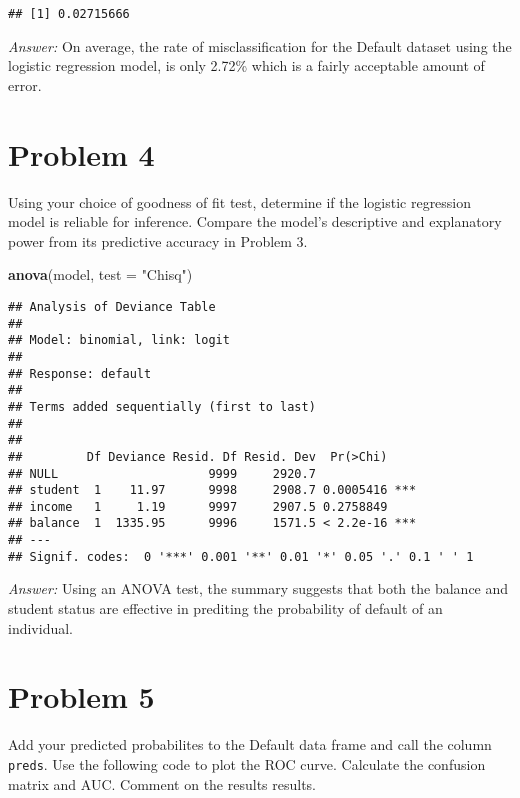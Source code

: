 \documentclass[11pt - \usepackage{enumerate},]{article}
\newenvironment{Shaded}{\begin{snugshade}}{\end{snugshade}}
\newcommand{\KeywordTok}[1]{\textcolor[rgb]{0.13,0.29,0.53}{\textbf{#1}}}
\newcommand{\DataTypeTok}[1]{\textcolor[rgb]{0.13,0.29,0.53}{#1}}
\newcommand{\StringTok}[1]{\textcolor[rgb]{0.31,0.60,0.02}{#1}}
\newcommand{\NormalTok}[1]{#1}
\begin{document}
\begin{verbatim}
## [1] 0.02715666
\end{verbatim}

\textit{Answer:} On average, the rate of misclassification for the
Default dataset using the logistic regression model, is only 2.72\%
which is a fairly acceptable amount of error.

\section{Problem 4}\label{problem-4}

Using your choice of goodness of fit test, determine if the logistic
regression model is reliable for inference. Compare the model's
descriptive and explanatory power from its predictive accuracy in
Problem 3.

\begin{Shaded}
\begin{Highlighting}[]
\KeywordTok{anova}\NormalTok{(model, }\DataTypeTok{test =} \StringTok{"Chisq"}\NormalTok{)}
\end{Highlighting}
\end{Shaded}

\begin{verbatim}
## Analysis of Deviance Table
## 
## Model: binomial, link: logit
## 
## Response: default
## 
## Terms added sequentially (first to last)
## 
## 
##         Df Deviance Resid. Df Resid. Dev  Pr(>Chi)    
## NULL                     9999     2920.7              
## student  1    11.97      9998     2908.7 0.0005416 ***
## income   1     1.19      9997     2907.5 0.2758849    
## balance  1  1335.95      9996     1571.5 < 2.2e-16 ***
## ---
## Signif. codes:  0 '***' 0.001 '**' 0.01 '*' 0.05 '.' 0.1 ' ' 1
\end{verbatim}

\textit{Answer:} Using an ANOVA test, the summary suggests that both the
balance and student status are effective in prediting the probability of
default of an individual.

\section{Problem 5}\label{problem-5}

Add your predicted probabilites to the Default data frame and call the
column \texttt{preds}. Use the following code to plot the ROC curve.
Calculate the confusion matrix and AUC. Comment on the results results.
\end{document}
